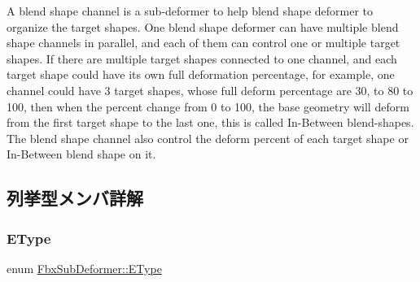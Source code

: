 A blend shape channel is a sub-\/deformer to help blend shape deformer to organize the target shapes. One blend shape deformer can have multiple blend shape channels in parallel, and each of them can control one or multiple target shapes. If there are multiple target shapes connected to one channel, and each target shape could have its own full deformation percentage, for example, one channel could have 3 target shapes, whose full deform percentage are 30, to 80 to 100, then when the percent change from 0 to 100, the base geometry will deform from the first target shape to the last one, this is called In-\/\+Between blend-\/shapes. The blend shape channel also control the deform percent of each target shape or In-\/\+Between blend shape on it. 

\subsection{列挙型メンバ詳解}
\mbox{\label{class_fbx_sub_deformer_aed7eba8aabbb8b25a8ddbab127d67319}} 
\subsubsection{\texorpdfstring{E\+Type}{EType}}
{\footnotesize\ttfamily enum \hyperlink{class_fbx_sub_deformer_aed7eba8aabbb8b25a8ddbab127d67319}{Fbx\+Sub\+Deformer\+::\+E\+Type}}

